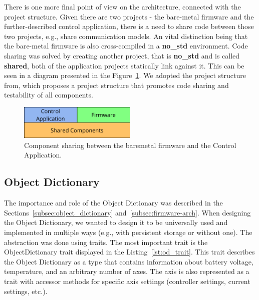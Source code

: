 There is one more final point of view on the architecture, connected with the project structure.
Given there are two projects - the bare-metal firmware and the further-described control application, there is a need to share code between those two projects, e.g., share communication models.
An vital distinction being that the bare-metal firmware is also cross-compiled in a \textbf{no\_std} environment.
Code sharing was solved by creating another project, that is \textbf{no\_std} and is called \textbf{shared}, both of the application projects statically link against it.
This can be seen in a diagram presented in the Figure~\ref{fig:component_arch}.
We adopted the project structure from\cite{aparicio_testing_nodate}, which proposes a project structure that promotes code sharing and testability of all components.

\begin{figure}[H]
    \centering
    \includegraphics[width=0.5\textwidth]{obrazky/components}
    \caption{Component sharing between the bare\textendash metal firmware and the Control Application.}
    \label{fig:component_arch}
\end{figure}

\subsection{Object Dictionary}
\label{subsec:object_dict_impl}
The importance and role of the Object Dictionary was described in the Sections~\ref{subsec:object_dictionary} and~\ref{subsec:firmware-arch}.
When designing the Object Dictionary, we wanted to design it to be universally used and implemented in multiple ways (e.g., with persistent storage or without one).
The abstraction was done using traits.
The most important trait is the ObjectDictionary trait displayed in the Listing~\ref{lst:od_trait}.
This trait describes the Object Dictionary as a type that contains information about battery voltage, temperature, and an arbitrary number of axes.
The axis is also represented as a trait with accessor methods for specific axis settings (controller settings, current settings, etc.).

